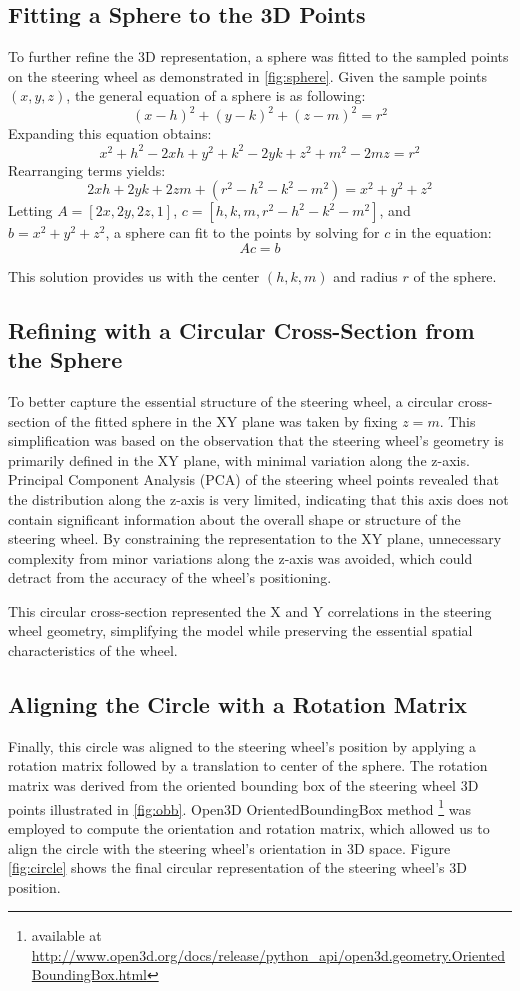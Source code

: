 \subsection{Fitting a Sphere to the 3D Points}
To further refine the 3D representation, a sphere was fitted to the sampled points on the steering wheel as demonstrated in
\cref{fig:sphere}. 
Given the sample points \((x, y, z)\), the general 
equation of a sphere is as following:
\[
(x - h)^2 + (y - k)^2 + (z - m)^2 = r^2
\]
Expanding this equation obtains:
\[
x^2 + h^2 - 2xh + y^2 + k^2 - 2yk + z^2 + m^2 - 2mz = r^2
\]
Rearranging terms yields:
\[
2xh + 2yk + 2zm + (r^2 - h^2 - k^2 - m^2) = x^2 + y^2 + z^2
\]
Letting \( A = [2x, 2y, 2z, 1] \), \( c = [h, k, m, r^2 - h^2 - k^2 - m^2] \), and 
\( b = x^2 + y^2 + z^2 \), a sphere can fit to the points by solving for \( c \) in the equation:
\[
Ac = b
\]

This solution provides us with the center \((h, k, m)\) and radius 
\(r\) of the sphere.


\subsection{Refining with a Circular Cross-Section from the Sphere}
To better capture the essential structure of the steering wheel, a circular cross-section of the fitted sphere in the XY plane was taken by fixing \( z = m \). This simplification was based on the observation that the steering wheel’s geometry is primarily defined in the XY plane, with minimal variation along the z-axis. 
Principal Component Analysis (PCA) of the steering wheel points 
revealed that the distribution along the z-axis is very limited, 
indicating that this axis does not contain significant information 
about the overall shape or structure of the steering wheel. 
By constraining the representation to the XY plane, unnecessary complexity from minor variations along 
the z-axis was avoided, which could detract from the accuracy of the wheel’s positioning.

This circular cross-section represented the X and Y 
correlations in the steering wheel geometry, 
simplifying the model while preserving the essential spatial 
characteristics of the wheel.


\subsection{Aligning the Circle with a Rotation Matrix}
Finally, this circle was aligned to the steering wheel’s position 
by applying a rotation matrix followed by a translation 
to center of the sphere. The rotation matrix was derived 
from the oriented bounding box of the steering wheel 3D points 
illustrated in \cref{fig:obb}. Open3D OrientedBoundingBox method 
\footnote{available at \url{http://www.open3d.org/docs/release/python_api/open3d.geometry.OrientedBoundingBox.html}}
was employed to compute the orientation and rotation matrix, 
which allowed us to align the circle with the steering 
wheel’s orientation in 3D space. 
Figure \cref{fig:circle} shows the final circular representation of the steering wheel's 3D position.

